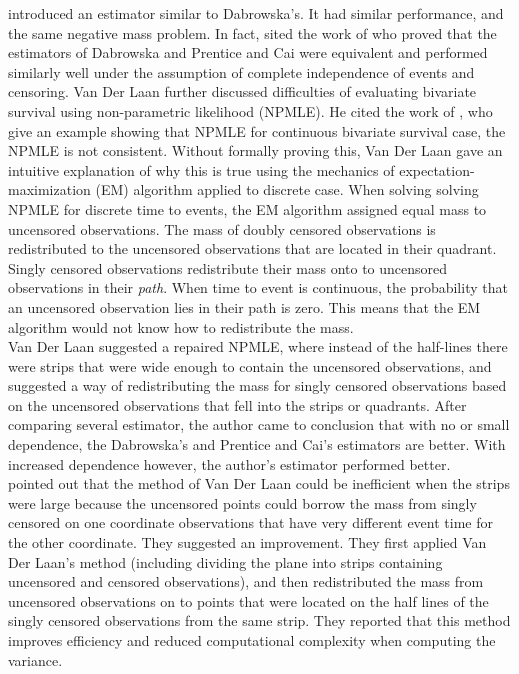 \documentclass[]{article}
\begin{document}
\cite{prentice1992covariance} introduced an estimator similar to Dabrowska's. It had similar performance, and the same negative mass problem. In fact, \cite{van1997nonparametric} sited the work of \cite{gill1990survey} who proved that the estimators of Dabrowska and Prentice and Cai were equivalent and performed similarly well under the assumption of complete independence of events and censoring. Van Der Laan further discussed difficulties of evaluating bivariate survival using non-parametric likelihood (NPMLE). He cited the work of \cite{tsai1986nonparametric}, who give an example showing that NPMLE for continuous bivariate survival case, the NPMLE is not consistent. Without formally proving this, Van Der Laan gave an intuitive explanation of why this is true using the mechanics of expectation-maximization (EM) algorithm applied to discrete case. When solving solving NPMLE for discrete time to events, the EM algorithm assigned equal mass to uncensored observations. The mass of doubly censored observations is redistributed to the uncensored observations that are located in their quadrant. Singly censored observations redistribute their mass onto to uncensored observations in their \emph{path}. When time to event is continuous, the probability that an uncensored observation lies in their path is zero. This means that the EM algorithm would not know how to redistribute the mass.\\

Van Der Laan suggested a repaired NPMLE, where instead of the half-lines there were strips that were wide enough to contain the uncensored observations, and suggested a way of redistributing the mass for singly censored observations based on the uncensored observations that fell into the strips or quadrants.
After comparing several estimator, the author came to conclusion that with no or small dependence, the Dabrowska's and Prentice and Cai's estimators are better. With increased dependence however, the author's estimator performed better.\\

\cite{moodie2005adjustment} pointed out that the method of Van Der Laan could be inefficient when the strips were large because the uncensored points could borrow the mass from singly censored on one coordinate observations that have very different event time for the other coordinate. They suggested an improvement. They first applied Van Der Laan's method (including dividing the plane into strips containing uncensored and censored observations), and then redistributed the mass from uncensored observations on to points that were located on the half lines of the singly censored observations from the same strip. They reported that this method improves efficiency and reduced computational complexity when computing the variance.
\end{document}
